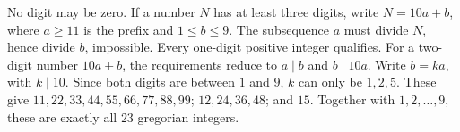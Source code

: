 No digit may be zero. If a number $N$ has at least three digits, write $N=10a+b$, where $a\ge 11$ is the prefix and $1\le b\le 9$. The subsequence $a$ must divide $N$, hence divide $b$, impossible. Every one-digit positive integer qualifies. For a two-digit number $10a+b$, the requirements reduce to $a\mid b$ and $b\mid 10a$. Write $b=ka$, with $k\mid 10$. Since both digits are between $1$ and $9$, $k$ can only be $1,2,5$. These give $11,22,33,44,55,66,77,88,99$; $12,24,36,48$; and $15$. Together with $1,2,\ldots,9$, these are exactly all $\boxed{23}$ gregorian integers.
